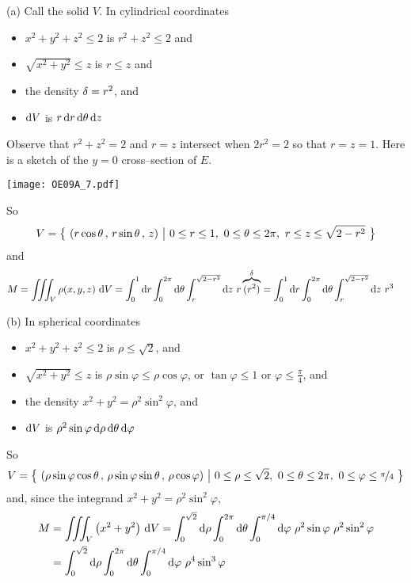 \begin{solution}
(a)
Call the solid $V$.
In cylindrical coordinates
\begin{itemize}
\item
$x^2+y^2+z^2\le 2$ is $r^2+z^2\le 2$ and
\item
$\sqrt{x^2+y^2}\le z$ is $r\le z$ and
\item
the density $\delta=r^2$, and
\item
$\mathrm{d}V$ is $r\,\mathrm{d}r\,\mathrm{d}\theta\,\mathrm{d}z$
\end{itemize}
Observe that $r^2+z^2= 2$ and $r= z$ intersect when $2r^2=2$ so that $r=z=1$.
Here is a sketch of the $y=0$ cross--section of $E$.
\begin{center}
     \texttt{[image: OE09A\_7.pdf]}
\end{center}
So
\begin{equation*}
V =\Set{(r\cos\theta\,,\,r\sin\theta\,,\,z)}{0\le r\le 1,\ 
                                             0\le\theta\le2\pi,\ 
                                              r\le z\le \sqrt{2-r^2}}
\end{equation*}
and
\begin{align*}
M &=\iiint_V \rho(x,y,z)\ \mathrm{d}V 
   =\int_0^1\mathrm{d}r\int_0^{2\pi}\mathrm{d}\theta
           \int_r^{\sqrt{2-r^2}}\mathrm{d}z\ r\overbrace{(r^2)}^{\delta}
   =\int_0^1\mathrm{d}r\int_0^{2\pi}\mathrm{d}\theta
           \int_r^{\sqrt{2-r^2}}\mathrm{d}z\ r^3
\end{align*}

(b)
In spherical coordinates
\begin{itemize}
\item
$x^2+y^2+z^2\le 2$ is $\rho\le\sqrt{2}$, and
\item
$\sqrt{x^2+y^2}\le z$ is $\rho\sin\varphi\le \rho\cos\varphi$,
or $\tan\varphi\le 1$ or $\varphi\le\frac{\pi}{4}$, and
\item
the density $x^2+y^2=\rho^2\sin^2\varphi$, and
\item
$\mathrm{d}V$ is $\rho^2\sin\varphi\,\mathrm{d}\rho\,\mathrm{d}\theta\,\mathrm{d}\varphi$
\end{itemize}
So
\begin{equation*}
V =\Set{(\rho\sin\varphi\cos\theta\,,\,\rho\sin\varphi\sin\theta\,,\,
          \rho\cos\varphi)}{0\le\rho\le \sqrt{2},\  0\le\theta\le2\pi,\ 
                            0\le \varphi\le \nicefrac{\pi}{4}}
\end{equation*}
and, since the integrand $x^2+y^2=\rho^2\sin^2\varphi$,
\begin{align*}
M &=\tripInt_V \big(x^2+y^2\big)\ \dee{V} 
   =\int_0^{\sqrt{2}}\dee{\rho}\int_0^{2\pi}\dee{\theta}
           \int_0^{\pi/4}\dee{\varphi}\ \rho^2\sin\varphi\ 
           \rho^2\sin^2\varphi \\
   &=\int_0^{\sqrt{2}}\dee{\rho}\int_0^{2\pi}\dee{\theta}
           \int_0^{\pi/4}\dee{\varphi}\ \rho^4\sin^3\varphi
\end{align*}



\end{solution}
